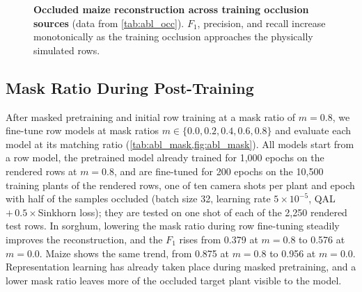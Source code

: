 \documentclass[10pt,twocolumn,letterpaper]{article}
\begin{document}
\begin{figure}[t]
  \centering
  \caption{\textbf{Occluded maize reconstruction across training occlusion sources} (data from \cref{tab:abl_occ}).
  $F_1$, precision, and recall increase monotonically as the training occlusion approaches the physically simulated rows.}
  \label{fig:abl_occ}
\end{figure}

\subsection{Mask Ratio During Post-Training}
\label{sec:abl_mask}

After masked pretraining and initial row training at a mask ratio of $m = 0.8$, we fine-tune row models at mask ratios
$m \in \{0.0, 0.2, 0.4, 0.6, 0.8\}$ and evaluate each model at its matching ratio (\cref{tab:abl_mask,fig:abl_mask}). All
models start from a row model, \ie the pretrained model already trained for 1{,}000 epochs on the rendered rows at
$m = 0.8$, and are fine-tuned for 200 epochs on the 10{,}500 training plants of the rendered rows, one of ten camera shots
per plant and epoch with half of the samples occluded (batch size 32, learning rate $5\times10^{-5}$, QAL
$+\,0.5\times$Sinkhorn loss); they are tested on one shot of each of the 2{,}250 rendered test rows. In sorghum, lowering the mask ratio
during row fine-tuning steadily improves the reconstruction, and the $F_1$ rises from 0.379 at $m = 0.8$ to
0.576 at $m = 0.0$. Maize shows the same trend, from 0.875 at $m = 0.8$ to 0.956 at $m = 0.0$. Representation learning has already taken place during masked pretraining, and a
lower mask ratio leaves more of the occluded target plant visible to the model.
\end{document}
